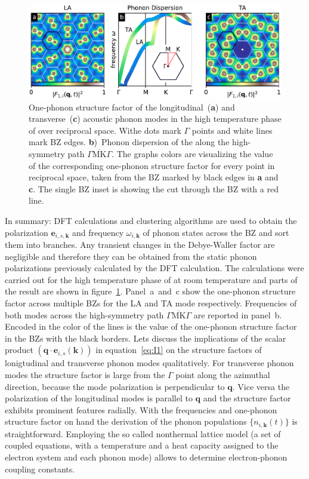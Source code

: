 \begin{figure}[!t]
	\includegraphics[width=\columnwidth]{figs/ops.pdf}
	\caption{One-phonon structure factor of the longitudinal~(\textbf{a}) and transverse~(\textbf{c}) acoustic phonon modes in the high temperature phase of \ts over reciprocal space. Withe dots mark $\Gamma$ points and white lines mark \ac{BZ} edges. \textbf{b})~Phonon dispersion of the along the high-symmetry path $\overline{\Gamma\mathrm{MK}\Gamma}$. The graphs colors are visualizing the value of the corresponding one-phonon structure factor for every point in reciprocal space, taken from the \ac{BZ} marked by black edges in \textbf{a} and \textbf{c}. The single \ac{BZ} inset is showing the cut through the \ac{BZ} with a red line.}
	\label{fig:ops}
\end{figure}

In summary: \Ac{DFT} calculations and clustering algorithms are used to obtain the polarization $\mathbf{e}_{i,s,\mathbf{k}}$ and frequency $\omega_{i,\mathbf{k}}$ of phonon states across the \ac{BZ} and sort them into branches.
Any transient changes in the Debye-Waller factor are negligible and therefore they can be obtained from the static phonon polarizations previously calculated by the \ac{DFT} calculation.
The calculations were carried out for the high temperature phase of \ts at room temperature and parts of the result are shown in figure~\ref{fig:ops}.
Panel~a~and~c show the one-phonon structure factor across multiple \acp{BZ} for the \ac{LA} and \ac{TA} mode respectively.
Frequencies of both modes across the high-symmetry path $\overline{\Gamma\mathrm{MK}\Gamma}$ are reported in panel~b.
Encoded in the color of the lines is the value of the one-phonon structure factor in the \acp{BZ} with the black borders.
Lets discuss the implications of the scalar product $\left( \mathbf{q}\cdot\mathbf{e}_{i, s}(\mathbf{k}) \right)$ in equation~\ref{eq:I1} on the structure factors of lonigtudinal and transverse phonon modes qualitatively.
For transverse phonon modes the structure factor is large from the $\Gamma$ point along the azimuthal direction, because the mode polarization is perpendicular to $\mathbf{q}$.
Vice versa the polarization of the longitudinal modes is parallel to $\mathbf{q}$ and the structure factor exhibits prominent features radially.
With the frequencies and one-phonon structure factor on hand the derivation of the phonon populations $\{n_{i,\mathbf{k}}(t)\}$ is straightforward.
Employing the so called nonthermal lattice model\cite{waldecker2016} (a set of coupled equations, with a temperature and a heat capacity assigned to the electron system and each phonon mode) allows to determine electron-phonon coupling constants.

